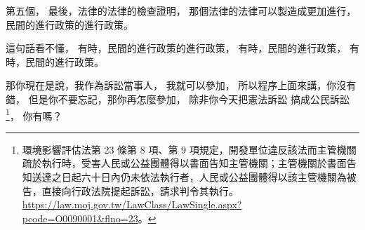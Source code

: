 \hypertarget{w06:cue:2897}{}第五個，
\hypertarget{w06:cue:2898}{}最後，法律的法律的檢查證明，
\hypertarget{w06:cue:2899}{}那個法律的法律可以製造成更加進行，
\hypertarget{w06:cue:2900}{}民間的進行政策的進行政策。

\hypertarget{w06:cue:2901}{}這句話看不懂，
\hypertarget{w06:cue:2902}{}有時，民間的進行政策的進行政策，
\hypertarget{w06:cue:2903}{}有時，民間的進行政策，
\hypertarget{w06:cue:2904}{}有時，民間的進行政策。

\hypertarget{w06:cue:2905}{}那你現在是說，我作為訴訟當事人，
\hypertarget{w06:cue:2906}{}我就可以參加，
\hypertarget{w06:cue:2907}{}所以程序上面來講，你沒有錯，
\hypertarget{w06:cue:2908}{}但是你不要忘記，那你再怎麼參加，
\hypertarget{w06:cue:2909}{}除非你今天把憲法訴訟 搞成公民訴訟\footnote{環境影響評估法第 23 條第 8 項、第 9 項規定，開發單位違反該法而主管機關疏於執行時，受害人民或公益團體得以書面告知主管機關；主管機關於書面告知送達之日起六十日內仍未依法執行者，人民或公益團體得以該主管機關為被告，直接向行政法院提起訴訟，請求判令其執行。\url{https://law.moj.gov.tw/LawClass/LawSingle.aspx?pcode=O0090001&flno=23}。}，
\hypertarget{w06:cue:2910}{}你有嗎？

